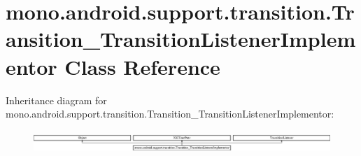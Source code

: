 \hypertarget{classmono_1_1android_1_1support_1_1transition_1_1_transition___transition_listener_implementor}{}\section{mono.\+android.\+support.\+transition.\+Transition\+\_\+\+Transition\+Listener\+Implementor Class Reference}
\label{classmono_1_1android_1_1support_1_1transition_1_1_transition___transition_listener_implementor}
Inheritance diagram for mono.\+android.\+support.\+transition.\+Transition\+\_\+\+Transition\+Listener\+Implementor\+:\begin{figure}[H]
\begin{center}
\leavevmode
\includegraphics[height=0.866203cm]{classmono_1_1android_1_1support_1_1transition_1_1_transition___transition_listener_implementor}
\end{center}
\end{figure}
